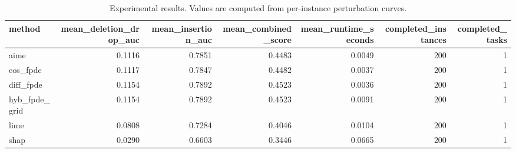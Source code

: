 \begin{table}[t]
\caption{Experimental results. Values are computed from per-instance perturbation curves.}
\label{tab:main_results_computed}
\centering
\begin{tabular}{lrrrrrr}
\toprule
method & mean\_deletion\_drop\_auc & mean\_insertion\_auc & mean\_combined\_score & mean\_runtime\_seconds & completed\_instances & completed\_tasks \\
\midrule
aime & 0.1116 & 0.7851 & 0.4483 & 0.0049 & 200 & 1 \\
cos\_fpde & 0.1117 & 0.7847 & 0.4482 & 0.0037 & 200 & 1 \\
diff\_fpde & 0.1154 & 0.7892 & 0.4523 & 0.0036 & 200 & 1 \\
hyb\_fpde\_grid & 0.1154 & 0.7892 & 0.4523 & 0.0091 & 200 & 1 \\
lime & 0.0808 & 0.7284 & 0.4046 & 0.0104 & 200 & 1 \\
shap & 0.0290 & 0.6603 & 0.3446 & 0.0665 & 200 & 1 \\
\bottomrule
\end{tabular}

\end{table}
